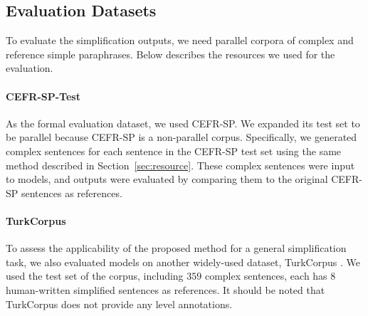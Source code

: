 \subsection{Evaluation Datasets}
To evaluate the simplification outputs, we need parallel corpora of complex and reference simple paraphrases. Below describes the resources we used for the evaluation.

\paragraph{CEFR-SP-Test}
As the formal evaluation dataset, we used CEFR-SP. 
We expanded its test set to be parallel because CEFR-SP is a non-parallel corpus. 
Specifically, we generated complex sentences for each sentence in the CEFR-SP test set using the same method described in Section~\ref{sec:resource}. 
These complex sentences were input to models, and outputs were evaluated by comparing them to the original CEFR-SP sentences as references.


\paragraph{TurkCorpus} To assess the applicability of the proposed method for a general simplification task, we also evaluated models on another widely-used dataset, TurkCorpus \cite{xu-etal-2016-optimizing}. We used the test set of the corpus, including $359$ complex sentences, each has $8$ human-written simplified sentences as references. 
It should be noted that TurkCorpus does not provide any level annotations. 



